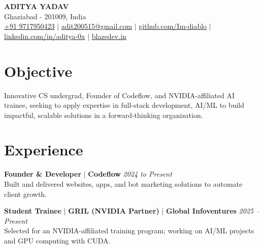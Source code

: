 \documentclass[10pt,a4paper]{article}
\begin{document}
\begin{center}
    {\Large\bfseries\color{headercolor} ADITYA YADAV}\\[3pt]
    Ghaziabad - 201009, India  \\
    \vspace{3pt}
    \href{tel:+91 9717950423}{+91 9717950423} $|$ 
    \href{mailto:adit200515@gmail.com}{adit200515@gmail.com} $|$ 
    \href{https://github.com/Im-diablo}{github.com/Im-diablo} $|$ 
    \href{https://www.linkedin.com/in/aditya-0x/}{linkedin.com/in/aditya-0x} $|$ 
     \href{https://blazedev.in}{blazedev.in} 
\end{center}

\section*{Objective}
Innovative CS undergrad, Founder of Codeflow, and NVIDIA-affiliated AI trainee,
seeking to apply expertise in full-stack development, AI/ML
to build impactful, scalable solutions in a forward-thinking organization.

\vspace{3pt}

\section*{Experience}
\sectionrule

\noindent\textbf{Founder \& Developer} $|$ \textbf{Codeflow} \hfill \textit{2024 to Present}
\\ Built and delivered websites, apps, and bot marketing solutions to automate client growth.
\vspace{2pt}

\noindent\textbf{Student Trainee} $|$ \textbf{GRIL (NVIDIA Partner)} $|$ \textbf{Global Infoventures} \hfill \textit{2025 -- Present}\\
Selected for an NVIDIA-affiliated training program; working on AI/ML projects and GPU computing with CUDA.
\end{document}
